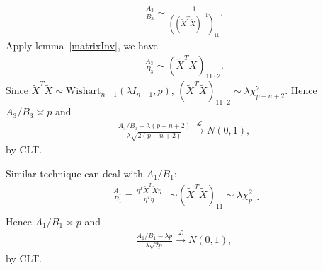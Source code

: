 \documentclass[review]{elsarticle}
\theoremstyle{plain}
\theoremstyle{definition}
\theoremstyle{remark}
\begin{document}
\begin{equation}
    \begin{aligned}
        \frac{A_3}{B_3}\sim 
        \frac{1}{{({(\tilde{X}^T\tilde{X})}^{-1})}_{11}}.
    \end{aligned}
\end{equation}
Apply lemma~\ref{matrixInv}, we have 
\begin{equation}
    \begin{aligned}
        \frac{A_3}{B_3}\sim 
        {(\tilde{X}^T\tilde{X})}_{11\cdot 2}.
    \end{aligned}
\end{equation}
Since $\tilde{X}^T \tilde{X}\sim \textrm{Wishart}_{n-1}(\lambda I_{n-1},p)$, ${(\tilde{X}^T\tilde{X})}_{11\cdot 2}\sim \lambda \chi^2_{p-n+2}$. Hence $A_3/B_3\asymp p$ and
\begin{equation}
    \begin{aligned}
        \frac{A_3/B_3-\lambda (p-n+2)}{\lambda\sqrt{2(p-n+2)}
        }\xrightarrow{\mathcal{L}}N(0,1),
    \end{aligned}
\end{equation}
by CLT.

Similar technique can deal with $A_1/B_1$:
\begin{equation}
    \begin{aligned}
        \frac{A_1}{B_1}=\frac{\eta^T \tilde{X}^T\tilde{X} \eta    
        }{\eta^T\eta}&\sim {(\tilde{X}^T\tilde{X})}_{11}\sim \lambda \chi^2_{p}
\\
    \end{aligned}.
\end{equation}
Hence $A_1/B_1\asymp p$ and 
\begin{equation}
    \begin{aligned}
        \frac{A_1/B_1
    -\lambda p}{\lambda\sqrt{2p}
        }\xrightarrow{\mathcal{L}}N(0,1),
    \end{aligned}
\end{equation}
by CLT.
\end{document}
